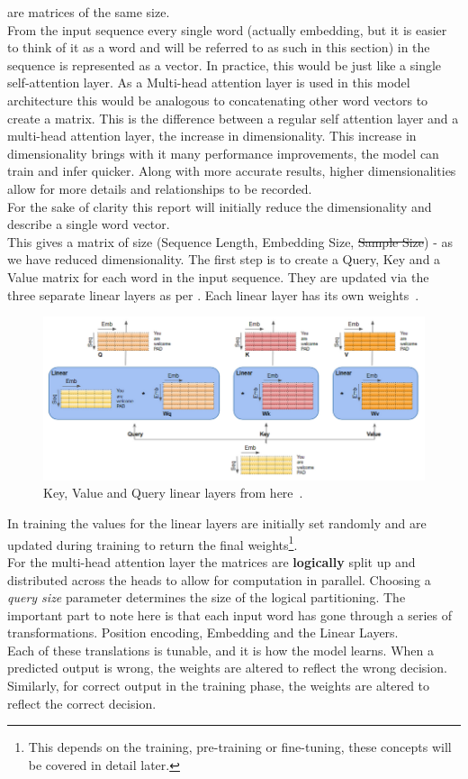 are matrices of the same size.\\
From the input sequence every single word (actually embedding, but it is easier to think of it as a word and will be referred to as such in this section)
in the sequence is represented as a vector. In practice, this would be just like a single self-attention layer. As a Multi-head attention layer is used in this
model architecture this would be analogous to concatenating other word vectors to create a matrix. This is the difference between a regular self attention layer
and a multi-head attention layer, the increase in dimensionality. This increase in dimensionality brings with it many performance improvements, the model
can train and infer quicker. Along with more accurate results, higher dimensionalities allow for more details and relationships to be recorded.\\
For the sake of clarity this report will initially reduce the dimensionality and describe a single word vector.\\
This gives a matrix of size (Sequence Length, Embedding Size, \sout{Sample Size}) - as we have reduced dimensionality.
\bigbreak
The first step is to create a Query, Key and a Value matrix for each word in the input sequence. They are updated via the three separate linear layers
as per . Each linear layer has its own weights~\autocite{alammarIllustratedTransformer}.
\begin{figure}[H]
	\centering
	\includegraphics[width=1\textwidth]{figures/k_v_q_linear_layers.png}
	\caption{Key, Value and Query linear layers from here~\autocite{doshiTransformersExplainedVisually2021a}.}
	\label{fig:kvq_ll}
\end{figure}
In training the values for the linear layers are initially set randomly and are updated during training to return the
final weights\footnote{This depends on the training, pre-training or fine-tuning, these concepts will be covered in detail later.}. \\
For the multi-head attention layer the matrices are \textbf{logically} split up and distributed across the heads to allow for computation in parallel.
Choosing a \emph{query size} parameter determines the size of the logical partitioning.
\bigbreak
The important part to note here is that each input word has gone through a series of transformations. Position encoding, Embedding and the Linear
Layers.\\
Each of these translations is tunable, and it is how the model learns. When a predicted output is wrong, the weights are altered to reflect the
wrong decision. Similarly, for correct output in the training phase, the weights are altered to reflect the correct decision.
